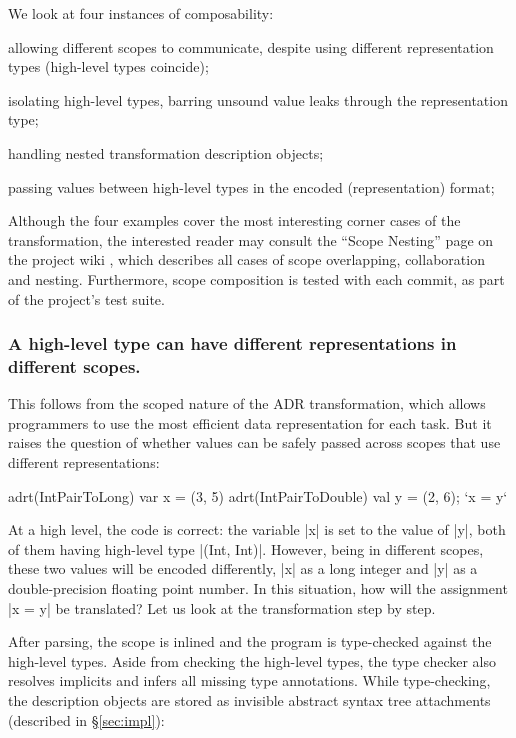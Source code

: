 We look at four instances of composability:

\vspace{0.3em}
\begin{compactitem}
  \item allowing different scopes to communicate, despite using different representation types (high-level types coincide);
  \item isolating high-level types, barring unsound value leaks through the representation type;
  \item handling nested transformation description objects;
  \item passing values between high-level types in the encoded (representation) format;
\end{compactitem}
\vspace{0.3em}

Although the four examples cover the most interesting corner cases of the transformation, the interested reader may consult the ``Scope Nesting'' page on the project wiki \cite{ildl-plugin-wiki}, which describes all cases of scope overlapping, collaboration and nesting. Furthermore, scope composition is tested with each commit, as part of the project's test suite.

\subsubsection{A high-level type can have different representations in different scopes.} This follows from the scoped nature of the ADR transformation, which allows programmers to use the most efficient data representation for each task. But it raises the question of whether values can be safely passed across scopes that use different representations:

\begin{lstlisting-nobreak}
adrt(IntPairToLong)   { var x = (3, 5) }
adrt(IntPairToDouble) { val y = (2, 6); `x = y` }
\end{lstlisting-nobreak}

At a high level, the code is correct: the variable |x| is set to the value of |y|, both of them having high-level type |(Int, Int)|. However, being in different scopes, these two values will be encoded differently, |x| as a long integer and |y| as a double-precision floating point number. In this situation, how will the assignment |x = y| be translated? Let us look at the transformation step by step.

After parsing, the scope is inlined and the program is type-checked against the high-level types. Aside from checking the high-level types, the type checker also resolves implicits and infers all missing type annotations. While type-checking, the description objects are stored as invisible abstract syntax tree attachments (described in \S\ref{sec:impl}):

